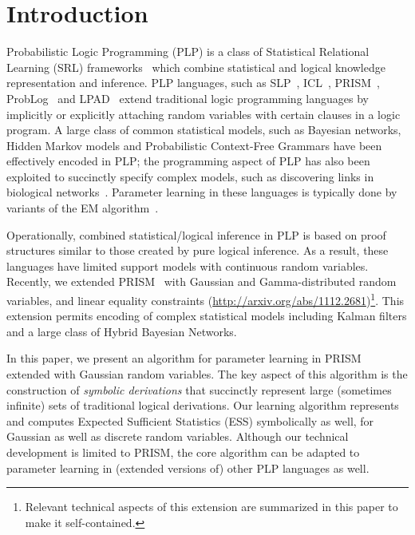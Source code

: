 \section{Introduction}
\label{sec:intro}

Probabilistic Logic Programming (PLP) is a 
class of Statistical Relational Learning
(SRL) frameworks~\cite{srlbook} which combine
statistical and logical knowledge representation and inference.
PLP languages, such as SLP~\cite{Muggleton}, ICL~\cite{PooleICL},
PRISM~\cite{sato-kameya-prism}, ProbLog~\cite{deRaedt} and
LPAD~\cite{lpad}  extend traditional logic
programming languages by implicitly or explicitly attaching 
random variables with certain clauses in a logic
program.  A large class of common statistical models, such as Bayesian
networks, Hidden Markov models and Probabilistic Context-Free Grammars
have been effectively encoded in PLP; the programming aspect of PLP
has also been exploited to succinctly specify complex models, such as
discovering links in biological networks~\cite{deRaedt}.  Parameter learning in these
languages is typically done by variants of the EM
algorithm~\cite{DempsterEM}.  

Operationally, combined statistical/logical inference in PLP is
based on proof structures similar to those created by
pure logical inference.  As a result, these languages have 
limited support models with continuous random
variables.  Recently, we extended PRISM~\cite{sato-kameya-prism}
with Gaussian and Gamma-distributed random variables, and
linear equality constraints (\url{http://arxiv.org/abs/1112.2681})\footnote{Relevant
  technical aspects of this extension are summarized in this paper to make it self-contained.}. This extension permits encoding of
complex statistical models including Kalman filters and a large class
of Hybrid Bayesian Networks.  

In this paper, we present an algorithm for parameter learning in PRISM
extended with Gaussian random variables.  The key aspect of this
algorithm is the construction of \emph{symbolic derivations} that
succinctly represent large (sometimes infinite) sets of traditional
logical derivations.  Our learning algorithm represents and computes
Expected Sufficient Statistics (ESS) symbolically as well, for
Gaussian as well as discrete random variables. 
Although our technical development is limited to PRISM, the core algorithm can be
adapted to parameter learning in (extended versions of) other PLP
languages as well.

